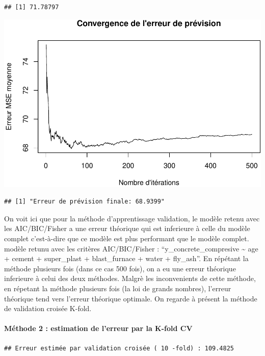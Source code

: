 \documentclass[
  12pt,
]{article}
\begin{document}
\begin{verbatim}
## [1] 71.78797
\end{verbatim}

\includegraphics{rmd_final_files/figure-latex/unnamed-chunk-50-1.pdf}

\begin{verbatim}
## [1] "Erreur de prévision finale: 68.9399"
\end{verbatim}

On voit ici que pour la méthode d'apprentissage validation, le modèle
retenu avec les AIC/BIC/Fisher a une erreur théorique qui est inferieure
à celle du modèle complet c'est-à-dire que ce modèle est plus performant
que le modèle complet. modèle retunu avec les critères AIC/BIC/Fisher :
``y\_concrete\_compresive \textasciitilde{} age + cement + super\_plast
+ blast\_furnace + water + fly\_ash''. En répétant la méthode plusieurs
fois (dans ce cas 500 fois), on a eu une erreur théorique inferieure à
celui des deux méthodes. Malgrè les inconvenients de cette méthode, en
répetant la méthode plusieurs fois (la loi de grands nombres), l'erreur
théorique tend vers l'erreur théorique optimale. On regarde à présent la
méthode de validation croisée K-fold.

\paragraph{Méthode 2 : estimation de l'erreur par la K-fold
CV}\label{muxe9thode-2-estimation-de-lerreur-par-la-k-fold-cv}

\begin{verbatim}
## Erreur estimée par validation croisée ( 10 -fold) : 109.4825
\end{verbatim}
\end{document}
